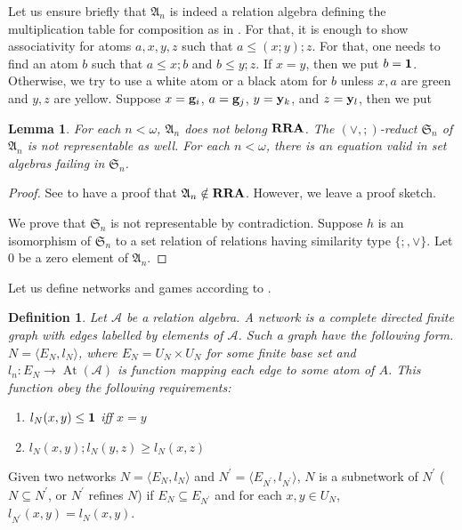 \documentclass[a4paper]{article}
\theoremstyle{defin}
\newtheorem{defin}{Definition}
\theoremstyle{theorem}
\theoremstyle{prop}
\theoremstyle{lemma}
\newtheorem{lemma}{Lemma}
\theoremstyle{ex}
\theoremstyle{col}
\begin{document}
Let us ensure briefly that $\mathfrak{A}_n$ is indeed a relation algebra defining the multiplication table for composition as in \cite{lyndon1950representation}. For that, it is enough to show associativity for atoms $a, x, y, z$ such that $a \leq (x ; y) ; z$. For that, one needs to find an atom $b$ such that $a \leq x ; b$ and $b \leq y ; z$. If $x = y$, then we put $b = {\bf 1}$. Otherwise, we try to use a white atom or a black atom for $b$ unless $x, a$ are green and $y, z$ are yellow.
Suppose $x = {\bf g}_i$, $a = {\bf g}_j$, $y = {\bf y}_k$, and $z = {\bf y}_l$, then we put

\begin{lemma}
  For each $n < \omega$, $\mathfrak{A}_n$ does not belong ${\bf RRA}$. The $(\vee, ;)$-reduct $\mathfrak{S}_n$ of $\mathfrak{A}_n$ is not representable as well. For each $n < \omega$, there is an equation valid in set algebras failing in $\mathfrak{S}_n$.
\end{lemma}

\begin{proof}
  See \cite{hodkinson2000axiomatizability} to have a proof that $\mathfrak{A}_n \notin {\bf RRA}$. However, we leave a proof sketch.

  We prove that $\mathfrak{S}_n$ is not representable by contradiction.
  Suppose $h$ is an isomorphism of $\mathfrak{S}_n$ to a set relation of relations having similarity type $\{ ;, \vee \}$. Let $0$ be a zero element of $\mathfrak{A}_n$.
\end{proof}

Let us define networks and games according to \cite{hirsch1997step}.

\begin{defin}
  Let $\mathcal{A}$ be a relation algebra. A network is a complete directed finite graph with edges labelled by elements of $\mathcal{A}$. Such a graph have the following form. $N = \langle E_N, l_N \rangle$, where $E_N = U_N \times U_N$ for some finite base set and $l_n : E_N \to \operatorname{At}(\mathcal{A})$ is function mapping each edge to some atom of $A$. This function obey the following requirements:
  \begin{enumerate}
    \item $l_N(x,y) \leq {\bf 1}$ iff $x = y$
    \item $l_N(x, y) ; l_N(y,z) \geq l_N(x,z)$
  \end{enumerate}
\end{defin}
Given two networks $N = \langle E_N, l_N \rangle$ and $N^{'} = \langle E_{N^{'}}, l_{N^{'}} \rangle$, $N$ is a subnetwork of $N^{'}$ ($N \subseteq N^{'}$, or $N^{'}$ refines $N$) if $E_N \subseteq E_{N^{'}}$ and for each $x,y \in U_N$, $l_{N^{'}}(x,y) = l_{N}(x,y)$.
\end{document}
